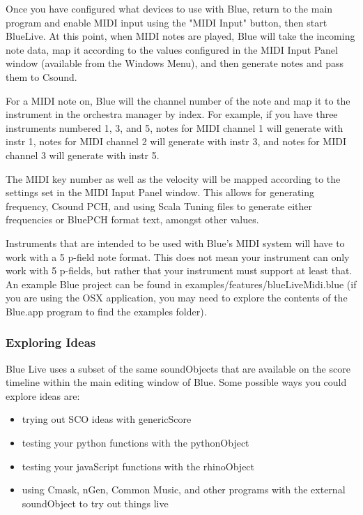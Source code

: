 Once you have configured what devices to use with Blue, return to the
main program and enable MIDI input using the "MIDI Input" button, then
start BlueLive. At this point, when MIDI notes are played, Blue will
take the incoming note data, map it according to the values configured
in the MIDI Input Panel window (available from the Windows Menu), and
then generate notes and pass them to Csound.

For a MIDI note on, Blue will the channel number of the note and map it
to the instrument in the orchestra manager by index. For example, if you
have three instruments numbered 1, 3, and 5, notes for MIDI channel 1
will generate with instr 1, notes for MIDI channel 2 will generate with
instr 3, and notes for MIDI channel 3 will generate with instr 5.

The MIDI key number as well as the velocity will be mapped according to
the settings set in the MIDI Input Panel window. This allows for
generating frequency, Csound PCH, and using Scala Tuning files to
generate either frequencies or BluePCH format text, amongst other
values.

Instruments that are intended to be used with Blue's MIDI system will
have to work with a 5 p-field note format. This does not mean your
instrument can only work with 5 p-fields, but rather that your
instrument must support at least that. An example Blue project can be
found in examples/features/blueLiveMidi.blue (if you are using the OSX
application, you may need to explore the contents of the Blue.app
program to find the examples folder).

\subsubsection{Exploring Ideas}

Blue Live uses a subset of the same soundObjects that are available on
the score timeline within the main editing window of Blue. Some possible
ways you could explore ideas are:

\begin{itemize}
\item
  trying out SCO ideas with genericScore
\item
  testing your python functions with the pythonObject
\item
  testing your javaScript functions with the rhinoObject
\item
  using Cmask, nGen, Common Music, and other programs with the external
  soundObject to try out things live
\end{itemize}

